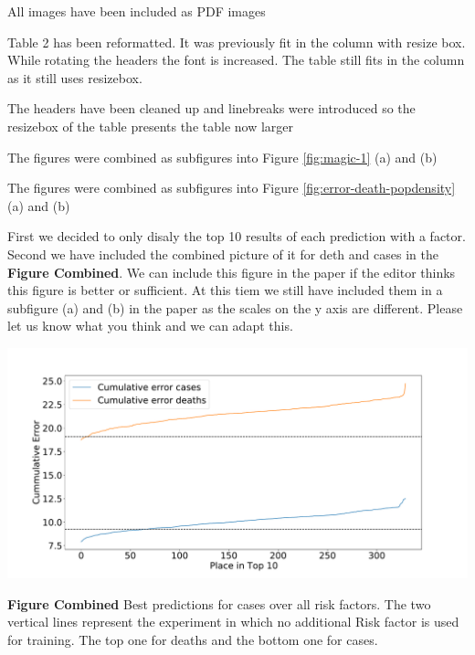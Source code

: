   {All images have been included as PDF images}


  { Table 2 has been reformatted. It was previously fit in the column
    with resize box. While rotating the headers the font is
    increased. The table still fits in the column as it still uses
    resizebox.}

  { The headers have been cleaned up and linebreaks were introduced so
    the resizebox of the table presents the table now larger} 

  {The figures were combined as subfigures into Figure \ref{fig:magic-1} (a) and (b)}


    {The figures were combined as subfigures into Figure \ref{fig:error-death-popdensity} (a) and (b)}


  {


First we decided to only disaly the top 10 results of each prediction
with a factor. Second we have included the combined picture of it for
deth and cases in the {\bf Figure Combined}. We can include this
figure in the paper if the editor thinks this figure is better or
sufficient. At this tiem we still have included them in a subfigure
(a) and (b) in the paper as the scales on the y axis are
different. Please let us know what you think and we can adapt this.

{
        \centering
        \includegraphics[width=.9\textwidth]{images/predict/PlaceTop10_CasesAndDeathNEW2.pdf}
        
        {\bf Figure Combined} Best predictions for cases over all risk factors.
The two vertical lines represent the experiment in which no additional Risk factor is used for training. The top one for deaths and the bottom one for cases.}        


}


